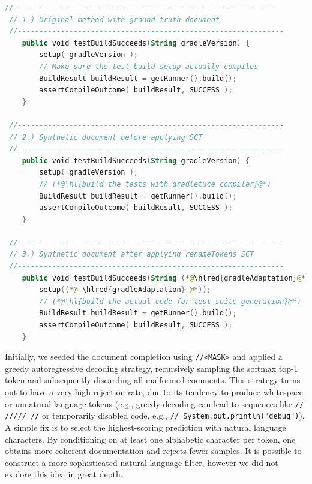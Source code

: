 \documentclass{article} %
\DeclareRobustCommand{\hlred}[1]{{\sethlcolor{pink}\hl{#1}}}
\begin{document}
\begin{lstlisting}[basicstyle=\scriptsize\ttfamily, language=kotlin,label={lst:example3}]
 //--------------------------------------------------------------
 // 1.) Original method with ground truth document
 //--------------------------------------------------------------
    public void testBuildSucceeds(String gradleVersion) {
        setup( gradleVersion );
        // Make sure the test build setup actually compiles
        BuildResult buildResult = getRunner().build();
        assertCompileOutcome( buildResult, SUCCESS );
    }

 //--------------------------------------------------------------
 // 2.) Synthetic document before applying SCT
 //--------------------------------------------------------------
    public void testBuildSucceeds(String gradleVersion) {
        setup( gradleVersion );
        // (*@\hl{build the tests with gradletuce compiler}@*)
        BuildResult buildResult = getRunner().build();
        assertCompileOutcome( buildResult, SUCCESS );
    }

 //--------------------------------------------------------------
 // 3.) Synthetic document after applying renameTokens SCT
 //--------------------------------------------------------------
    public void testBuildSucceeds(String (*@\hlred{gradleAdaptation}@*)) {
        setup((*@ \hlred{gradleAdaptation} @*));
        // (*@\hl{build the actual code for test suite generation}@*)
        BuildResult buildResult = getRunner().build();
        assertCompileOutcome( buildResult, SUCCESS );
    }
\end{lstlisting}

Initially, we seeded the document completion using \lstinline|//<MASK>| and applied a greedy autoregressive decoding strategy, recursively sampling the softmax top-1 token and subsequently discarding all malformed comments. This strategy turns out to have a very high rejection rate, due to its tendency to produce whitespace or unnatural language tokens (e.g., greedy decoding can lead to sequences like \lstinline|// ///// //| or temporarily disabled code, e.g., \lstinline|// System.out.println("debug")|). A simple fix is to select the highest-scoring prediction with natural language characters. By conditioning on at least one alphabetic character per token, one obtains more coherent documentation and rejects fewer samples. It is possible to construct a more sophisticated natural language filter, however we did not explore this idea in great depth.
\end{document}

